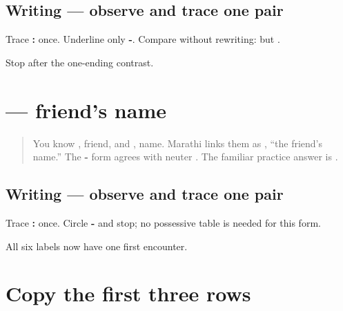 \subsection*{Writing — observe and trace one pair}
Trace \textbf{ : } once. Underline only \textbf{-}. Compare without rewriting: \textbf{ } but \textbf{ }.

\begin{tcolorbox}[breakable,colback=teal!4,colframe=teal!35!black,title={Before you move on}]
Stop after the one-ending contrast.
\end{tcolorbox}
\section[\texorpdfstring{\mr{मित्राचे} \mr{नाव}: \mr{अरुण} (mitrāce nāv: Aruṇ)}{मित्राचे नाव: अरुण (mitrāce nāv: Aruṇ)}]{  — friend's name}

\label{lesson:MR-A1F01-mitrache-naav}



\begin{quote}
You know \textbf{}, friend, and \textbf{}, name. Marathi links them as \textbf{ }, “the friend's name.” The \textbf{-} form agrees with neuter \textbf{}. The familiar practice answer is \textbf{}.
\end{quote}

\subsection*{Writing — observe and trace one pair}
Trace \textbf{ : } once. Circle \textbf{-} and stop; no possessive table is needed for this form.

\begin{tcolorbox}[breakable,colback=teal!4,colframe=teal!35!black,title={Before you move on}]
All six labels now have one first encounter.
\end{tcolorbox}
\section[\texorpdfstring{\mr{नाव} · \mr{शहर} · \mr{भाषा} (nāv · śahar · bhāṣā)}{नाव · शहर · भाषा (nāv · śahar · bhāṣā)}]{Copy the first three rows}

\label{lesson:MR-A1F02-first-three-copy}



